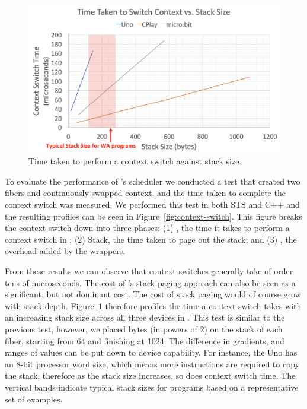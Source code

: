 \begin{figure}[ht]
    \includegraphics[width=.99\columnwidth]{images/context-vs-stack.png}
\caption{\label{fig:context-vs-stack}Time taken to perform a context switch against stack size.}
\end{figure}

To evaluate the performance of \CON's scheduler we conducted a test that created two fibers and continuously swapped context,
and the time taken to complete the context switch was measured. 
We performed this test in both STS and C++ and the resulting profiles can be seen in Figure~\ref{fig:context-switch}. 
This figure breaks the context switch down into three phases: 
(1) \CO, the time it takes to perform a context switch in \CO; 
(2) Stack, the time taken to page out the \MC stack; and 
(3) \MC, the overhead added by the \MC wrappers. 

From these results we can observe that context switches generally take of order tens of microseconds. 
The cost of \CON's stack paging approach can also be seen as a significant, but not dominant cost. 
The cost of stack paging would of course grow with stack depth.
Figure~\ref{fig:context-vs-stack} therefore profiles the time a context switch takes with an increasing stack size across all three devices in \CO. 
This test is similar to the previous test, however, we placed bytes (in powers of 2) on the stack of each fiber, starting from 64 and finishing at 1024. 
The difference in gradients, and ranges of values can be put down to device capability. 
For instance, the Uno has an 8-bit processor word size, which means more instructions are required to copy the stack, therefore as the stack size increases, so does context switch time. 
The vertical bands indicate typical stack sizes for \MC programs based on a representative set of examples.

